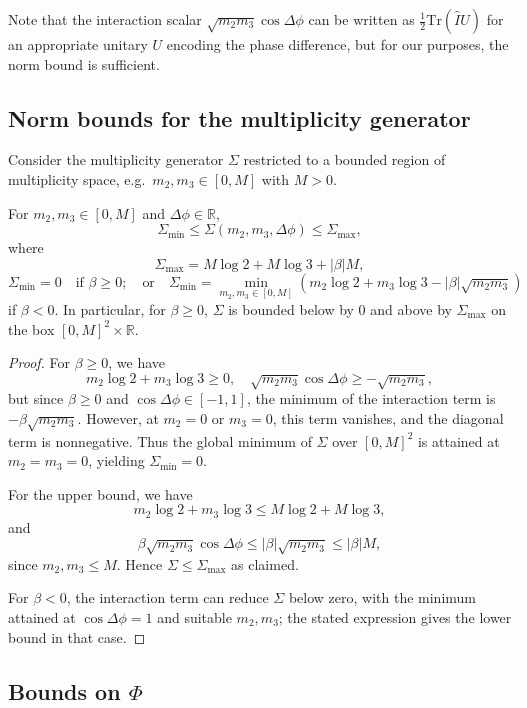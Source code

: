 \documentclass[11pt]{article}
\begin{document}
Note that the interaction scalar \(\sqrt{m_2 m_3}\cos\Delta\phi\) can be written as \(\frac{1}{2}\mathrm{Tr}(\hat{I} U)\) for an appropriate unitary \(U\) encoding the phase difference, but for our purposes, the norm bound is sufficient.

\subsection{Norm bounds for the multiplicity generator}

Consider the multiplicity generator \(\Sigma\) restricted to a bounded region of multiplicity space, e.g.\ \(m_2,m_3 \in [0,M]\) with \(M>0\).

\begin{proposition}
For \(m_2,m_3\in[0,M]\) and \(\Delta\phi\in\mathbb{R}\),
\[
\Sigma_{\min} \le \Sigma(m_2,m_3,\Delta\phi) \le \Sigma_{\max},
\]
where
\[
\Sigma_{\max} = M\log 2 + M\log 3 + |\beta| M,
\]
\[
\Sigma_{\min} = 0 \quad \text{if } \beta\ge 0;
\quad\text{or}\quad
\Sigma_{\min} = \min_{m_2,m_3\in[0,M]} \left(m_2\log 2 + m_3\log 3 - |\beta|\sqrt{m_2 m_3}\right)
\]
if \(\beta<0\). In particular, for \(\beta\ge 0\), \(\Sigma\) is bounded below by 0 and above by \(\Sigma_{\max}\) on the box \([0,M]^2\times\mathbb{R}\).
\end{proposition}

\begin{proof}
For \(\beta\ge 0\), we have
\[
m_2\log 2 + m_3\log 3 \ge 0,\quad
\sqrt{m_2 m_3}\cos\Delta\phi \ge -\sqrt{m_2 m_3},
\]
but since \(\beta\ge 0\) and \(\cos\Delta\phi\in[-1,1]\), the minimum of the interaction term is \(-\beta\sqrt{m_2m_3}\). However, at \(m_2=0\) or \(m_3=0\), this term vanishes, and the diagonal term is nonnegative. Thus the global minimum of \(\Sigma\) over \([0,M]^2\) is attained at \(m_2=m_3=0\), yielding \(\Sigma_{\min}=0\).

For the upper bound, we have
\[
m_2\log 2 + m_3\log 3 \le M\log 2 + M\log 3,
\]
and
\[
\beta\sqrt{m_2m_3}\cos\Delta\phi \le |\beta|\sqrt{m_2m_3} \le |\beta| M,
\]
since \(m_2,m_3\le M\). Hence \(\Sigma\le \Sigma_{\max}\) as claimed.

For \(\beta<0\), the interaction term can reduce \(\Sigma\) below zero, with the minimum attained at \(\cos\Delta\phi = 1\) and suitable \(m_2,m_3\); the stated expression gives the lower bound in that case.
\end{proof}

\subsection{Bounds on \texorpdfstring{\(\Phi\)}{Phi}}
\end{document}
